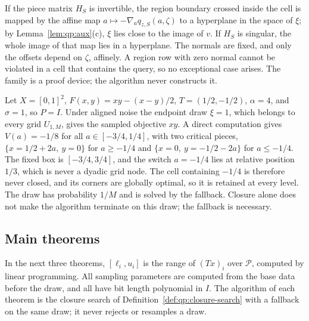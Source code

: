 If the piece matrix $H_S$ is invertible, the region boundary crossed inside
the cell is mapped by the affine map $a\mapsto-\nabla_aq_{z,S}(a,\zeta)$ to a
hyperplane in the space of $\xi$; by Lemma~\ref{lem:qp:aux}(c), $\xi$ lies
close to the image of $v$. If $H_S$ is singular, the whole image of that
map lies in a hyperplane. The normals are fixed, and only the offsets depend on
$\zeta$, affinely. A region row with zero normal cannot be violated in a cell
that contains the query, so no exceptional case arises. The family is a proof
device; the algorithm never constructs it.

\begin{example}\label{ex:qp:atom}
Let $X=[0,1]^2$, $F(x,y)=xy-(x-y)/2$, $T=(1/2,-1/2)$, $\alpha=4$, and
$\sigma=1$, so $P=I$. Under aligned noise the endpoint draw $\xi=1$, which
belongs to every grid $U_{1,M}$, gives the sampled objective $xy$.
A direct computation gives $V(a)=-1/8$ for all $a\in[-3/4,1/4]$, with two
critical pieces, $\{x=1/2+2a,\ y=0\}$ for $a\ge-1/4$ and
$\{x=0,\ y=-1/2-2a\}$ for $a\le-1/4$. The fixed box is $[-3/4,3/4]$, and the
switch $a=-1/4$ lies at relative position $1/3$, which is never a dyadic grid
node. The cell containing $-1/4$ is therefore never closed, and its corners are
globally optimal, so it is retained at every level. The draw has probability
$1/M$ and is solved by the fallback. Closure alone does not make the
algorithm terminate on this draw; the fallback is necessary.
\end{example}

\subsection{Main theorems}\label{sec:qp:main}

In the next three theorems, $[\ell_i,u_i]$ is the range of $(Tx)_i$ over
$\mathcal P$, computed by linear programming. All sampling parameters are
computed from the base data before the draw, and all have bit length
polynomial in $I$. The algorithm of each theorem is the closure search of
Definition~\ref{def:qp:closure-search} with a fallback on the same draw; it
never rejects or resamples a draw.

